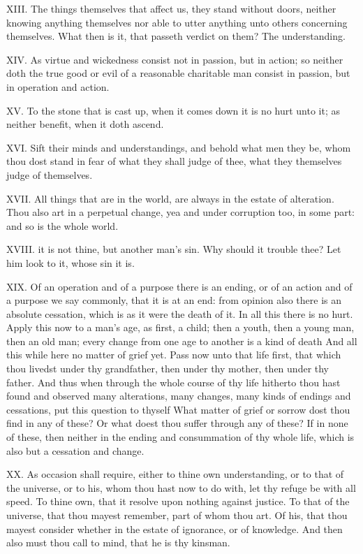 XIII. The things themselves that affect us, they stand without doors,
neither knowing anything themselves nor able to utter anything unto others
concerning themselves. What then is it, that passeth verdict on them? The
understanding.

XIV. As virtue and wickedness consist not in passion, but in action; so
neither doth the true good or evil of a reasonable charitable man consist
in passion, but in operation and action.

XV. To the stone that is cast up, when it comes down it is no hurt unto
it; as neither benefit, when it doth ascend.

XVI. Sift their minds and understandings, and behold what men they be,
whom thou dost stand in fear of what they shall judge of thee, what they
themselves judge of themselves.

XVII. All things that are in the world, are always in the estate
of alteration. Thou also art in a perpetual change, yea and under
corruption too, in some part: and so is the whole world.

XVIII. it is not thine, but another man's sin. Why should it trouble
thee? Let him look to it, whose sin it is.

XIX. Of an operation and of a purpose there is an ending, or of an
action and of a purpose we say commonly, that it is at an end: from
opinion also there is an absolute cessation, which is as it were the death
of it. In all this there is no hurt. Apply this now to a man's age, as
first, a child; then a youth, then a young man, then an old man; every
change from one age to another is a kind of death And all this while here
no matter of grief yet. Pass now unto that life first, that which thou
livedst under thy grandfather, then under thy mother, then under thy
father. And thus when through the whole course of thy life hitherto thou
hast found and observed many alterations, many changes, many kinds of
endings and cessations, put this question to thyself What matter of grief
or sorrow dost thou find in any of these? Or what doest thou suffer
through any of these? If in none of these, then neither in the ending and
consummation of thy whole life, which is also but a cessation and change.

XX. As occasion shall require, either to thine own understanding, or to
that of the universe, or to his, whom thou hast now to do with, let thy
refuge be with all speed. To thine own, that it resolve upon nothing
against justice. To that of the universe, that thou mayest remember, part
of whom thou art. Of his, that thou mayest consider whether in the estate
of ignorance, or of knowledge. And then also must thou call to mind, that
he is thy kinsman.

